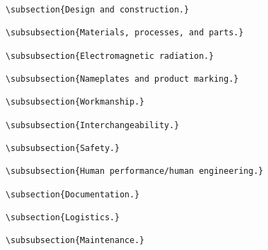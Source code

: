 \begin{itemize}
\begin{small}
\begin{verbatim}
\subsection{Design and construction.}

\subsubsection{Materials, processes, and parts.}

\subsubsection{Electromagnetic radiation.}

\subsubsection{Nameplates and product marking.}

\subsubsection{Workmanship.}

\subsubsection{Interchangeability.}

\subsubsection{Safety.}

\subsubsection{Human performance/human engineering.}

\subsection{Documentation.}

\subsection{Logistics.}

\subsubsection{Maintenance.}


\end{verbatim}
\end{small}
\end{itemize}
